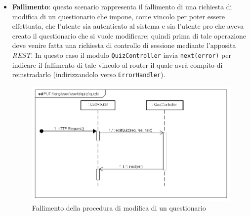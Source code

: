 \begin{itemize}
\item \textbf{Fallimento}: questo scenario rappresenta il fallimento di una richiesta di modifica di un questionario che impone, come vincolo per poter essere effettuata, che l'utente sia autenticato al sistema e sia l'utente pro che aveva creato il questionario che si vuole modificare; quindi prima di tale operazione deve venire fatta una richiesta di controllo di sessione mediante l'apposita \textit{REST}. In questo caso il modulo \texttt{QuizController} invia \texttt{next(error)} per indicare il fallimento di tale vincolo al router il quale avrà compito di reinstradarlo (indirizzandolo verso \texttt{ErrorHandler}).
\label{Fallimento della procedura di modifica di un questionario}
\begin{figure}[ht]
	\centering
	\includegraphics[scale=0.40]{UML/DiagrammiDiSequenza/Back-end/PUT__lang_user_userId_quiz_quizId_failure.png}
	\caption{Fallimento della procedura di modifica di un questionario}
\end{figure}
\FloatBarrier
\end{itemize}

